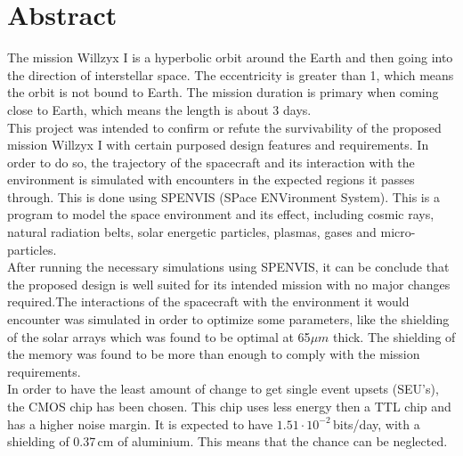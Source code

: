{}
\section*{\label{sec:abstract}Abstract}
The mission Willzyx I is a hyperbolic orbit around the Earth and then going into the direction of interstellar space. The eccentricity is greater than 1, which means the orbit is not bound to Earth. The mission duration is primary when coming close to Earth, which means the length is about 3 days.\\

This project was intended to confirm or refute the survivability of the proposed mission Willzyx I with certain purposed design features and requirements. In order to do so, the trajectory of the spacecraft and its interaction with the environment is simulated with encounters in the expected regions it passes through. This is done using SPENVIS (SPace ENVironment System). This is a program to model the space environment and its effect, including cosmic rays, natural radiation belts, solar energetic particles, plasmas, gases and micro-particles.\\

After running the necessary simulations using SPENVIS, it can be conclude that the proposed design is well suited for its intended mission with no major changes required.The interactions of the spacecraft with the environment it would encounter was simulated in order to optimize some parameters, like the shielding of the solar arrays which was found to be optimal at 65$\mu m$ thick. The shielding of the memory was found to be more than enough to comply with the mission requirements. \\

In order to have the least amount of change to get single event upsets (SEU's), the CMOS chip has been chosen. This chip uses less energy then a TTL chip and has a higher noise margin. It is expected to have $1.51 \cdot 10^{-2}$\,bits/day, with a shielding of 0.37\,cm of aluminium. This means that the chance can be neglected.
